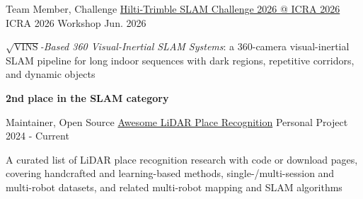 \begin{cventries}
  \cventry
    {Team Member, Challenge}
    {\href{https://sparolab.github.io/research/hilti_challenge/}{Hilti-Trimble SLAM Challenge 2026 @ ICRA 2026}}
    {ICRA 2026 Workshop}
    {Jun. 2026}
    {
      \begin{cvitems}
        \item \textit{$\sqrt{\mathrm{VINS}}$-Based 360 Visual-Inertial SLAM Systems}: a 360-camera visual-inertial SLAM pipeline for long indoor sequences with dark regions, repetitive corridors, and dynamic objects
        \item \textbf{2nd place in the SLAM category}
      \end{cvitems}
    }

  \cventry
    {Maintainer, Open Source}
    {\href{https://github.com/hogyun2/awesome-lidar-place-recognition}{Awesome LiDAR Place Recognition} }
    {Personal Project}
    {2024 - Current}
    {
      \begin{cvitems}
        \item A curated list of LiDAR place recognition research with code or download pages, covering handcrafted and learning-based methods, single-/multi-session and multi-robot datasets, and related multi-robot mapping and SLAM algorithms
      \end{cvitems}
    }
\end{cventries}
